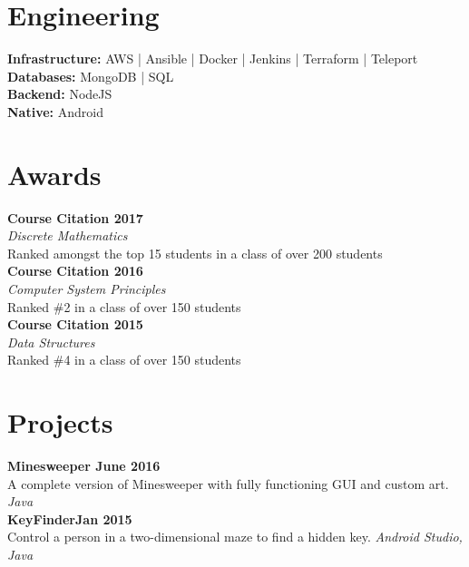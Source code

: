 \documentclass[letterpaper]{deedy-resume} %
\begin{document}
\begin{minipage}[t]{0.32\textwidth}
\sectionspace %

\section{Engineering}


{\bf Infrastructure:}
AWS | Ansible | Docker | Jenkins | Terraform | Teleport \\  
{\bf Databases:}
MongoDB | SQL \\
{\bf Backend:} 
NodeJS \\
{\bf Native:}
Android

\sectionspace %

\section{Awards}
{\bf Course Citation \hfill 2017} \\ 
\textit{Discrete Mathematics} \\ 
Ranked amongst the top 15 students in a class of over 200 students\\
\vspace{2mm}
{\bf Course Citation \hfill 2016} \\ 
\textit{Computer System Principles} \\ 
Ranked \#2 in a class of over 150 students\\
\vspace{2mm}
{\bf Course Citation \hfill 2015} \\ \textit{Data Structures} \\
 Ranked \#4 in a class of over 150 students\\
 \vspace{2mm}

\section{Projects} 
\textbullet{} {\bf Minesweeper \hfill June 2016} \\ A complete version of Minesweeper with fully functioning GUI and custom art. {\it Java} \\
\textbullet{} {\bf KeyFinder\hfill Jan 2015} \\ Control a person in a two-dimensional maze to find a hidden key. {\it Android Studio, Java} 

\end{minipage} %
\end{document}
